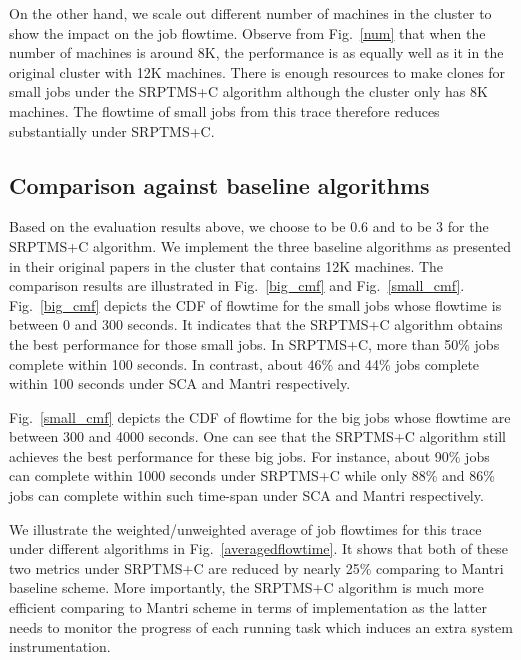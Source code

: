 \documentclass[10pt,conference,compsocconf,letterpaper]{IEEEtran}
\begin{document}
On the other hand, we scale out different number of machines in the cluster to show the impact on the job flowtime. Observe from Fig.~\ref{num}
that when the number of machines is around 8K, the performance is as equally well as  it in the original cluster with 12K machines.  There is  enough resources to
make clones for small jobs under the SRPTMS+C algorithm although the cluster only has 8K machines. The flowtime of small jobs from this trace therefore reduces substantially under SRPTMS+C.



\subsection{Comparison against baseline algorithms}
Based on the evaluation results above, we choose  to be 0.6 and  to be 3 for the SRPTMS+C algorithm. We implement the three baseline algorithms as presented in their original papers in the cluster that contains 12K machines. The comparison results are illustrated in Fig.~\ref{big_cmf} and Fig.~\ref{small_cmf}. Fig.~\ref{big_cmf} depicts the CDF of  flowtime for the small jobs whose
 flowtime is between 0 and 300 seconds.  It indicates that the SRPTMS+C algorithm obtains the best performance for those small jobs. In SRPTMS+C, more than 50\% jobs complete within 100 seconds. In contrast, about 46\% and 44\% jobs complete within 100 seconds under SCA and Mantri respectively.

Fig.~\ref{small_cmf} depicts the CDF of  flowtime for the big jobs whose
 flowtime are between 300 and 4000 seconds. One can see that the SRPTMS+C algorithm still achieves the best performance for these big jobs. For instance, about 90\% jobs can complete within 1000 seconds under SRPTMS+C while only 88\% and 86\% jobs can complete within such time-span under SCA and Mantri respectively.

We illustrate the weighted/unweighted average of job flowtimes for this trace under different algorithms in Fig.~\ref{averagedflowtime}. It shows that both of these two metrics under SRPTMS+C are reduced by nearly 25\% comparing to Mantri baseline scheme. More importantly, the SRPTMS+C algorithm is much more efficient comparing to Mantri scheme in terms of implementation as the latter needs to monitor the progress of each running task which induces an extra system instrumentation.  
\end{document}
